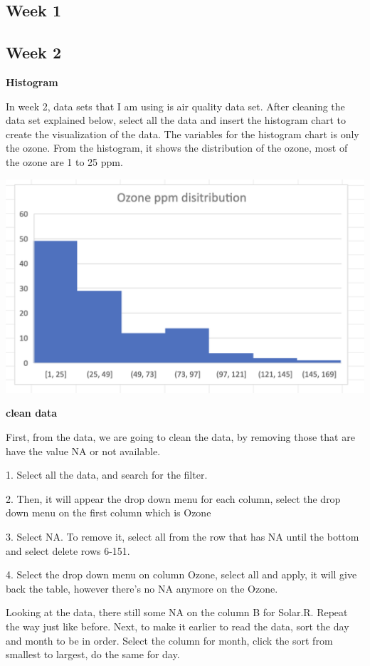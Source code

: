 \documentclass[
  letterpaper,
  DIV=11,
  numbers=noendperiod]{scrreprt}
\begin{document}
\subsection{Week 1}\label{week-1-1}

\subsection{Week 2}\label{week-2-1}

\textbf{Histogram}

In week 2, data sets that I am using is air quality data set. After
cleaning the data set explained below, select all the data and insert
the histogram chart to create the visualization of the data. The
variables for the histogram chart is only the ozone. From the histogram,
it shows the distribution of the ozone, most of the ozone are 1 to 25
ppm.

\includegraphics{./histogramozone.png}

\textbf{clean data}

First, from the data, we are going to clean the data, by removing those
that are have the value NA or not available.

1. Select all the data, and search for the filter.

2. Then, it will appear the drop down menu for each column, select the
drop down menu on the first column which is Ozone

3. Select NA. To remove it, select all from the row that has NA until
the bottom and select delete rows 6-151.

4. Select the drop down menu on column Ozone, select all and apply, it
will give back the table, however there's no NA anymore on the Ozone.

Looking at the data, there still some NA on the column B for Solar.R.
Repeat the way just like before. Next, to make it earlier to read the
data, sort the day and month to be in order. Select the column for
month, click the sort from smallest to largest, do the same for day.
\end{document}
